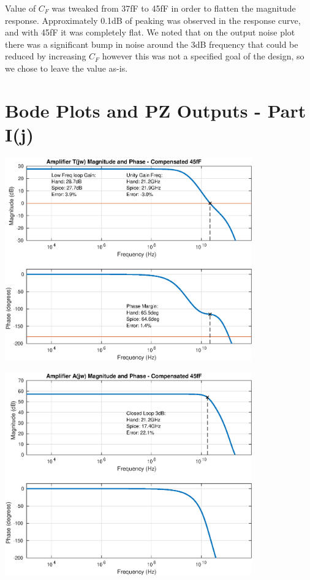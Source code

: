 \documentclass[12pt,a4paper]{article}
\begin{document}
Value of $C_F$ was tweaked from 37fF to 45fF in order to flatten the magnitude response. Approximately 0.1dB of peaking was observed in the response curve, and with 45fF it was completely flat. We noted that on the output noise plot there was a significant bump in noise around the 3dB frequency that could be reduced by increasing $C_F$ however this was not a specified goal of the design, so we chose to leave the value as-is.
\pagebreak




\section{Bode Plots and PZ Outputs - Part I(j)}

{\centering
	\includegraphics[width=0.8\textwidth]{plots/part_j_t.eps}
\par}

\pagebreak

{\centering
	\includegraphics[width=0.8\textwidth]{plots/part_j_a.eps}
\par}
\end{document}
